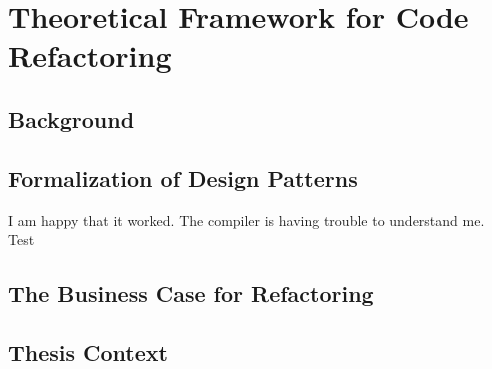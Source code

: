 \chapter{Theoretical Framework for Code Refactoring}

\section{Background}
\section{Formalization of Design Patterns}
I am happy that it worked.
The compiler is having trouble to understand me.
Test
\section{The Business Case for Refactoring}
\section{Thesis Context}
